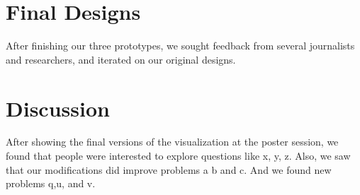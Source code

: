 \section{Final Designs}
After finishing our three prototypes, we sought feedback from several journalists and researchers, and iterated on our original designs. 




\section{Discussion}
After showing the final versions of the visualization at the poster session, we found that people were interested to explore questions like x, y, z.  Also, we saw that our modifications did improve problems a b and c.  And we found new problems q,u, and v.